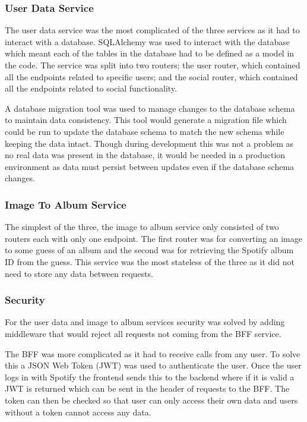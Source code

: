 \subsubsection{User Data Service}
The user data service was the most complicated of the three services as it had to interact with a database. SQLAlchemy was used to interact with the database which meant each of the tables in the database had to be defined as a model in the code. The service was split into two routers; the user router, which contained all the endpoints related to specific users; and the social router, which contained all the endpoints related to social functionality.

A database migration tool was used to manage changes to the database schema to maintain data consistency. This tool would generate a migration file which could be run to update the database schema to match the new schema while keeping the data intact. Though during development this was not a problem as no real data was present in the database, it would be needed in a production environment as data must persist between updates even if the database schema changes.

\subsubsection{Image To Album Service}
The simplest of the three, the image to album service only consisted of two routers each with only one endpoint. The first router was for converting an image to some guess of an album and the second was for retrieving the Spotify album ID from the guess. This service was the most stateless of the three as it did not need to store any data between requests.

\subsubsection{Security}
For the user data and image to album services security was solved by adding middleware that would reject all requests not coming from the BFF service.

The BFF was more complicated as it had to receive calls from any user. To solve this a JSON Web Token (JWT) was used to authenticate the user. Once the user logs in with Spotify the frontend sends this to the backend where if it is valid a JWT is returned which can be sent in the header of requests to the BFF. The token can then be checked so that user can only access their own data and users without a token cannot access any data.

